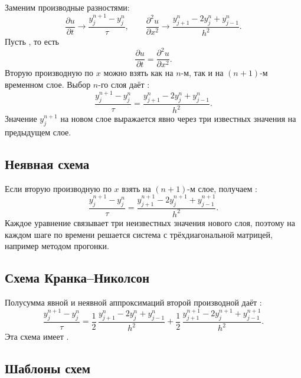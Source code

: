 \documentclass[../final.tex]{subfiles}
\begin{document}
Заменим производные разностями:
\begin{equation*}
    \frac{\partial u}{\partial t}\to\frac{y_j^{n+1}-y_j^n}{\tau},
    \qquad
    \frac{\partial^2u}{\partial x^2}\to
    \frac{y_{j+1}^n-2y_j^n+y_{j-1}^n}{h^2}.
\end{equation*}
Пусть , то есть
\begin{equation*}
    \frac{\partial u}{\partial t}=\frac{\partial^2u}{\partial x^2}.
\end{equation*}
Вторую производную по $x$ можно взять как на $n$-м, так и на
$(n+1)$-м временном слое. Выбор $n$-го слоя даёт
:
\begin{equation*}
    \frac{y_j^{n+1}-y_j^n}{\tau}
    =\frac{y_{j+1}^n-2y_j^n+y_{j-1}^n}{h^2}.
\end{equation*}
Значение $y_j^{n+1}$ на новом слое выражается явно через три
известных значения на предыдущем слое.

\subsection{Неявная схема}

Если вторую производную по $x$ взять на $(n+1)$-м слое, получаем
:
\begin{equation*}
    \frac{y_j^{n+1}-y_j^n}{\tau}
    =\frac{y_{j+1}^{n+1}-2y_j^{n+1}+y_{j-1}^{n+1}}{h^2}.
\end{equation*}
Каждое уравнение связывает три неизвестных значения нового слоя,
поэтому на каждом шаге по времени решается система
с трёхдиагональной матрицей, например методом прогонки.

\subsection{Схема Кранка--Николсон}

Полусумма явной и неявной аппроксимаций второй производной даёт
:
\begin{equation*}
    \frac{y_j^{n+1}-y_j^n}{\tau}
    =\frac12\,\frac{y_{j+1}^n-2y_j^n+y_{j-1}^n}{h^2}
    +\frac12\,\frac{y_{j+1}^{n+1}-2y_j^{n+1}+y_{j-1}^{n+1}}{h^2}.
\end{equation*}
Эта схема имеет .

\subsection{Шаблоны схем}
\end{document}
